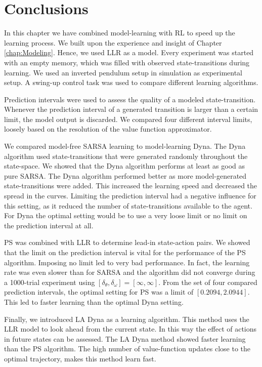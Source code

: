 \section{Conclusions}

In this chapter we have combined model-learning with \acl{RL} to speed up the learning process. We built upon the experience and insight of Chapter \ref{chap:Modeling}. Hence, we used \acl{LLR} as a model. Every experiment was started with an empty memory, which was filled with observed state-transitions during learning. We used an inverted pendulum setup in simulation as experimental setup. A swing-up control task was used to compare different learning algorithms. 

Prediction intervals were used to assess the quality of a modeled state-transition. Whenever the prediction interval of a generated transition is larger than a certain limit, the model output is discarded. We compared four different interval limits, loosely based on the resolution of the value function approximator.

We compared model-free SARSA learning to model-learning Dyna. The Dyna algorithm used state-transitions that were generated randomly throughout the state-space. We showed that the Dyna algorithm performs at least as good as pure SARSA. The Dyna algorithm performed better as more model-generated state-transitions were added. This increased the learning speed and decreased the spread in the curves. Limiting the prediction interval had a negative influence for this setting, as it reduced the number of state-transitions available to the agent. For Dyna the optimal setting would be to use a very loose limit or no limit on the prediction interval at all.

\acl{PS} was combined with \ac{LLR} to determine lead-in state-action pairs. We showed that the limit on the prediction interval is vital for the performance of the \ac{PS} algorithm. Imposing no limit led to very bad performance. In fact, the learning rate was even slower than for SARSA and the algorithm did not converge during a 1000-trial experiment using $[\delta_\theta,\delta_\omega]=[\infty,\infty]$. From the set of four compared prediction intervals, the optimal setting for \ac{PS} was a limit of $[0.2094,2.0944]$. This led to faster learning than the optimal Dyna setting.

Finally, we introduced \acl{LA Dyna} as a learning algorithm. This method uses the \ac{LLR} model to look ahead from the current state. In this way the effect of actions in future states can be assessed. The \ac{LA Dyna} method showed faster learning than the \ac{PS} algorithm. The high number of value-function updates close to the optimal trajectory, makes this method learn fast.
